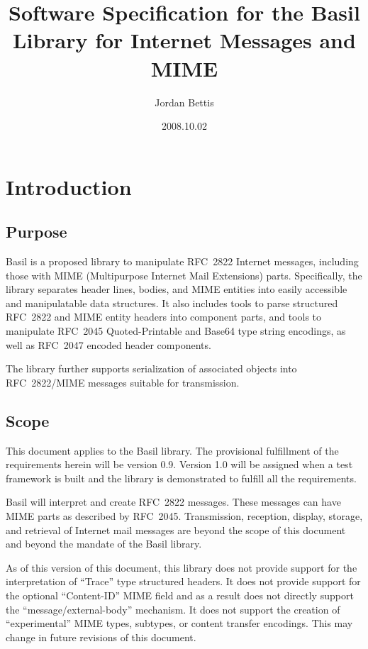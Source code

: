 \documentclass[11pt]{article}
\title{Software Specification for the Basil Library for Internet Messages and MIME}
\author{Jordan Bettis}
\date{2008.10.02}
\begin{document}
\maketitle
\tableofcontents
\newpage

\section{Introduction}

\subsection{Purpose}
\label{purpose}

Basil is a proposed library to manipulate RFC~2822 Internet
messages, including those with MIME (Multipurpose Internet Mail
Extensions) parts. Specifically, the library separates
header lines, bodies, and MIME entities into easily accessible and
manipulatable data structures. It also includes tools to parse
structured RFC~2822 and MIME entity headers into component parts, and
tools to manipulate RFC~2045 Quoted-Printable and Base64 type string
encodings, as well as RFC~2047 encoded header components.

The library further supports serialization of associated objects into
RFC~2822/MIME messages suitable for transmission.



\subsection{Scope}
\label{scope}

This document applies to the Basil library. The provisional
fulfillment of the requirements herein will be version 0.9. Version
1.0 will be assigned when a test framework is built and the library is
demonstrated to fulfill all the requirements.

Basil will interpret and create RFC~2822 messages. These messages
can have MIME parts as described by RFC~2045. Transmission,
reception, display, storage, and retrieval of Internet mail messages
are beyond the scope of this document and beyond the mandate of the
Basil library.

As of this version of this document, this library does not provide
support for the interpretation of ``Trace'' type structured
headers. It does not provide support for the optional ``Content-ID''
MIME field and as a result does not directly support the
``message/external-body'' mechanism. It does not support the creation
of ``experimental'' MIME types, subtypes, or content transfer
encodings. This may change in future revisions of this document.
\end{document}
